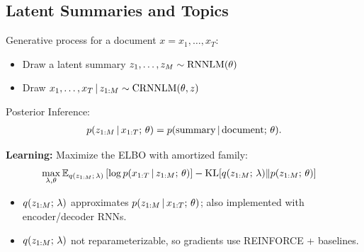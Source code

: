 \subsection{Latent Summaries and Topics}

\begin{frame}
Generative process for a document $x = x_1, \ldots, x_T$:
\begin{itemize}
    \item Draw a latent summary $z_1, \ldots, z_{M} \sim \operatorname*{RNNLM}(\theta) $%
    \item Draw $x_1, \ldots, x_{T} \,|\, z_{1:M} \sim \operatorname*{CRNNLM}(\theta, z) $ %
\end{itemize}

    
\air
\air
\air
\pause
Posterior Inference:
\begin{align*}
p(z_{1:M} \,|\, x_{1:T} ; \, \theta) = p(\text{summary} \,|\, \text{document} ; \, \theta).    
\end{align*}
\end{frame}

\begin{frame}
\textbf{Learning:} Maximize the ELBO with amortized  family:
\begin{align*}
    \max_{\lambda, \theta} \mathbb{E}_{q(z_{1:M} ; \, \lambda)} &\left[\log p(x_{1:T} \,|\, z_{1:M} ; \, \theta) \right] - \operatorname*{KL}[q(z_{1:M} ; \, \lambda) \Vert p(z_{1:M} ; \, \theta)]
\end{align*}

\begin{itemize}
    \item $q(z_{1:M} ; \, \lambda)$ approximates $p(z_{1:M} \,|\, x_{1:T} ; \, \theta)$; also implemented with encoder/decoder RNNs.
    \item $q(z_{1:M} ; \, \lambda)$ not reparameterizable, so gradients use REINFORCE + baselines.
\end{itemize}

\end{frame}

